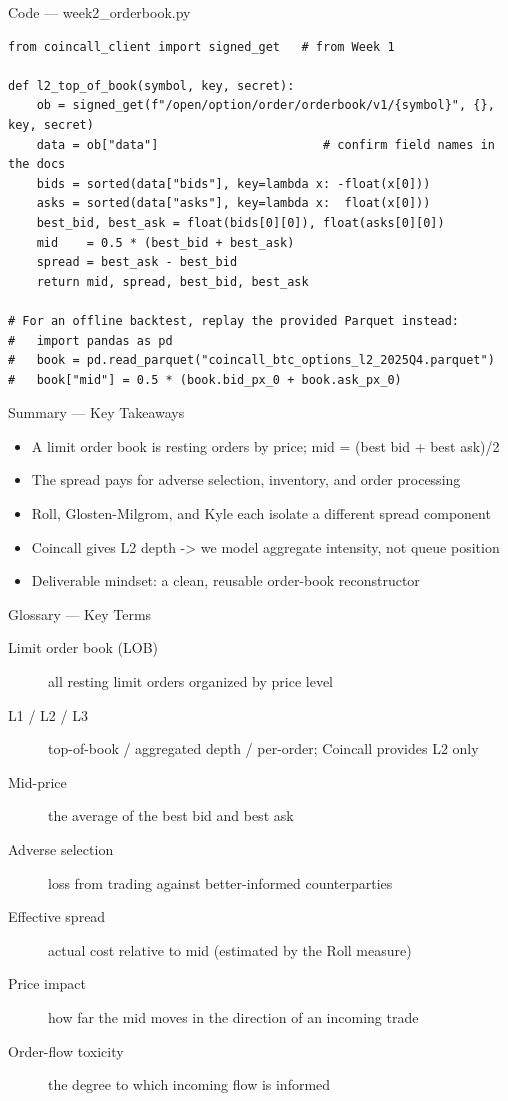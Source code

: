 \documentclass[aspectratio=169,10pt]{beamer}
\begin{document}
\begin{frame}[fragile]{Code --- week2\_orderbook.py}
\begin{lstlisting}
from coincall_client import signed_get   # from Week 1

def l2_top_of_book(symbol, key, secret):
    ob = signed_get(f"/open/option/order/orderbook/v1/{symbol}", {}, key, secret)
    data = ob["data"]                       # confirm field names in the docs
    bids = sorted(data["bids"], key=lambda x: -float(x[0]))
    asks = sorted(data["asks"], key=lambda x:  float(x[0]))
    best_bid, best_ask = float(bids[0][0]), float(asks[0][0])
    mid    = 0.5 * (best_bid + best_ask)
    spread = best_ask - best_bid
    return mid, spread, best_bid, best_ask

# For an offline backtest, replay the provided Parquet instead:
#   import pandas as pd
#   book = pd.read_parquet("coincall_btc_options_l2_2025Q4.parquet")
#   book["mid"] = 0.5 * (book.bid_px_0 + book.ask_px_0)
\end{lstlisting}
\end{frame}
\begin{frame}{Summary --- Key Takeaways}
\begin{itemize}
  \item A limit order book is resting orders by price; mid = (best bid + best ask)/2
  \item The spread pays for adverse selection, inventory, and order processing
  \item Roll, Glosten-Milgrom, and Kyle each isolate a different spread component
  \item Coincall gives L2 depth -\textgreater{} we model aggregate intensity, not queue position
  \item Deliverable mindset: a clean, reusable order-book reconstructor
\end{itemize}
\end{frame}

\begin{frame}{Glossary --- Key Terms}
\footnotesize\begin{description}
\item[\color{ncsured}Limit order book (LOB)] all resting limit orders organized by price level
\item[\color{ncsured}L1 / L2 / L3] top-of-book / aggregated depth / per-order; Coincall provides L2 only
\item[\color{ncsured}Mid-price] the average of the best bid and best ask
\item[\color{ncsured}Adverse selection] loss from trading against better-informed counterparties
\item[\color{ncsured}Effective spread] actual cost relative to mid (estimated by the Roll measure)
\item[\color{ncsured}Price impact] how far the mid moves in the direction of an incoming trade
\item[\color{ncsured}Order-flow toxicity] the degree to which incoming flow is informed
\end{description}
\end{frame}
\end{document}
